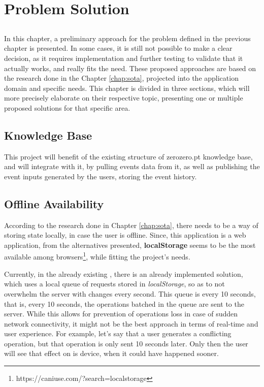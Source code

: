 \chapter{Problem Solution}\label{chap:problem-solution}

\section*{}

In this chapter, a preliminary approach for the problem defined in the previous chapter is presented. In some cases, it is still not possible to make a clear decision, as it requires implementation and further testing to validate that it actually works, and really fits the need. These proposed approaches are based on the research done in the Chapter \ref{chap:sota}, projected into the application domain and specific needs. This chapter is divided in three sections, which will more precisely elaborate on their respective topic, presenting one or multiple proposed solutions for that specific area. 

\section{Knowledge Base}
This project will benefit of the existing structure of zerozero.pt knowledge base, and will integrate with it, by pulling events data from it, as well as publishing the event inputs generated by the users, storing the event history.

\section{Offline Availability} \label{sec:prob-solution-offline-avail}
According to the research done in Chapter \ref{chap:sota}, there needs to be a way of storing state locally, in case the user is offline. Since, this application is a web application, from the alternatives presented, \textbf{localStorage} seems to be the most available among browsers\footnote{https://caniuse.com/?search=localstorage}, while fitting the project's needs. 

Currently, in the already existing , there is an already implemented solution, which uses a local queue of requests stored in \textit{localStorage}, so as to not overwhelm the server with changes every second. This queue is  every 10 seconds, that is, every 10 seconds, the operations batched in the queue are sent to the server. While this allows for prevention of operations loss in case of sudden network connectivity, it might not be the best approach in terms of real-time and user experience. For example, let's say that a user generates a conflicting operation, but that operation is only sent 10 seconds later. Only then the user will see that effect on is device, when it could have happened sooner.

